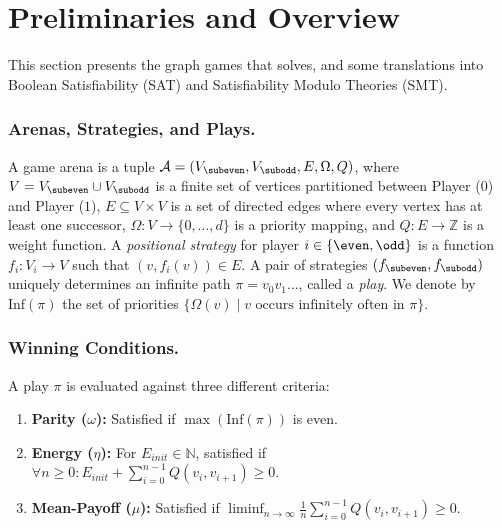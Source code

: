 \documentclass[runningheads]{llncs}
\begin{document}
\section{Preliminaries and Overview}

This section presents the graph games that \nocq solves, and some translations into Boolean Satisfiability (SAT) and Satisfiability Modulo Theories (SMT).

\subsubsection{Arenas, Strategies, and Plays.}

A game arena is a tuple $\mathcal{A} = (V_{\subeven}, V_{\subodd}, E, \Omega, Q)$, where $V = V_{\subeven} \cup V_{\subodd}$ is a finite set of vertices partitioned between Player \even ($0$) and Player \odd ($1$), $E \subseteq V \times V$ is a set of directed edges where every vertex has at least one successor, $\Omega: V \to \{0, \dots, d\}$ is a priority mapping, and $Q: E \to \mathbb{Z}$ is a weight function.
%
A \textit{positional strategy} for player $i \in \{\even, \odd\}$ is a function $f_{i} : V_{i} \to V$ such that $(v, f_i(v)) \in E$. A pair of strategies $(f_{\subeven}, f_{\subodd})$ uniquely determines an infinite path $\pi = v_0 v_1 \dots$, called a \textit{play}. We denote by $\text{Inf}(\pi)$ the set of priorities $\{\Omega(v) \mid v \text{ occurs infinitely often in } \pi\}$.

\subsubsection{Winning Conditions.}
A play $\pi$ is evaluated against three different criteria:
%
\begin{enumerate}
    \item \textbf{Parity ($\omega$):} Satisfied if $\max(\text{Inf}(\pi))$ is even.
    \item \textbf{Energy ($\eta$):} For $E_{init} \in \mathbb{N}$, satisfied if $\forall n \ge 0: E_{init} + \sum_{i=0}^{n-1} Q(v_i, v_{i+1}) \ge 0$.
    \item \textbf{Mean-Payoff ($\mu$):} Satisfied if $\liminf_{n \to \infty} \frac{1}{n} \sum_{i=0}^{n-1} Q(v_i, v_{i+1}) \ge 0$.
\end{enumerate}
\end{document}
